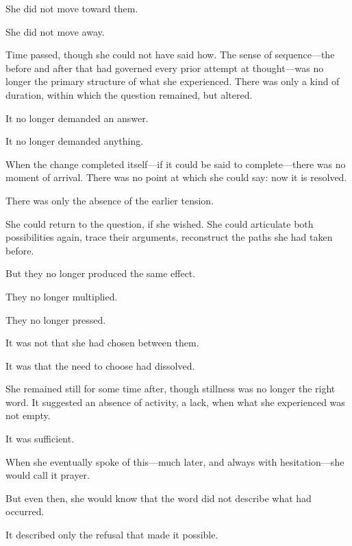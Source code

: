 She did not move toward them.

She did not move away.

Time passed, though she could not have said how. The sense of
sequence---the before and after that had governed every prior
attempt at thought---was no longer the primary structure of what
she experienced. There was only a kind of duration, within which
the question remained, but altered.

It no longer demanded an answer.

It no longer demanded anything.

When the change completed itself---if it could be said to
complete---there was no moment of arrival. There was no point at
which she could say: now it is resolved.

There was only the absence of the earlier tension.

She could return to the question, if she wished. She could
articulate both possibilities again, trace their arguments,
reconstruct the paths she had taken before.

But they no longer produced the same effect.

They no longer multiplied.

They no longer pressed.

It was not that she had chosen between them.

It was that the need to choose had dissolved.

\scenebreak

She remained still for some time after, though stillness was no
longer the right word. It suggested an absence of activity, a
lack, when what she experienced was not empty.

It was sufficient.

When she eventually spoke of this---much later, and always with
hesitation---she would call it prayer.

But even then, she would know that the word did not describe what
had occurred.

It described only the refusal that made it possible.
